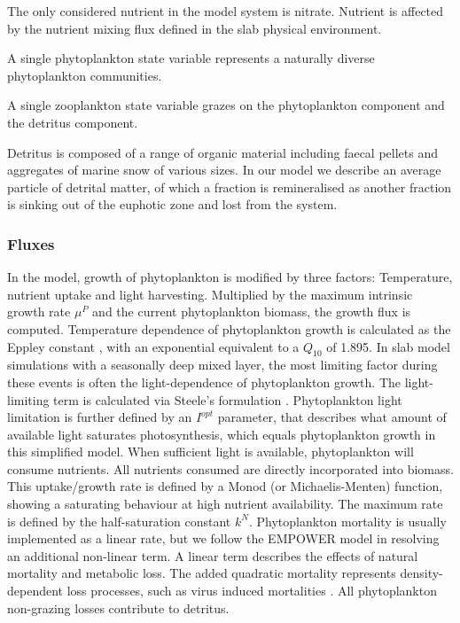 \documentclass[journal abbreviations, manuscript]{copernicus}
\begin{document}
The only considered nutrient in the model system is nitrate. Nutrient is affected by the nutrient mixing flux defined in the slab physical environment.

A single phytoplankton state variable represents a naturally diverse phytoplankton communities. 

A single zooplankton state variable grazes on the phytoplankton component and the detritus component.

Detritus is composed of a range of organic material including faecal pellets and aggregates of marine snow of various sizes. In our model we describe an average particle of detrital matter, of which a fraction is remineralised as another fraction is sinking out of the euphotic zone and lost from the system. 



\subsubsection{Fluxes} \label{Section:SlabNPZD_Fluxes}


In the model, growth of phytoplankton is modified by three factors: Temperature, nutrient uptake and light harvesting. Multiplied by the maximum intrinsic growth rate $\mu^P$ and the current phytoplankton biomass, the growth flux is computed. 
Temperature dependence of phytoplankton growth is calculated as the Eppley constant \citep{Eppley1972TemperatureSea}, with an exponential equivalent to a $Q_{10}$ of 1.895.
In slab model simulations with a seasonally deep mixed layer, the most limiting factor during these events is often the light-dependence of phytoplankton growth. The light-limiting term is calculated via Steele's formulation \citep{Steele1962EnvironmentalSea}. Phytoplankton light limitation is further defined by an $I^{opt}$ parameter, that describes what amount of available light saturates photosynthesis, which equals phytoplankton growth in this simplified model.
When sufficient light is available, phytoplankton will consume nutrients. All nutrients consumed are directly incorporated into biomass. This uptake/growth rate is defined by a Monod (or Michaelis-Menten) function, showing a saturating behaviour at high nutrient availability. The maximum rate is defined by the half-saturation constant $k^N$. 
Phytoplankton mortality is usually implemented as a linear rate, but we follow the EMPOWER model in resolving an additional non-linear term. A linear term describes the effects of natural mortality and metabolic loss. The added quadratic mortality represents density-dependent loss processes, such as virus induced mortalities \citep{Anderson2015c}.  
All phytoplankton non-grazing losses contribute to detritus.
\end{document}

